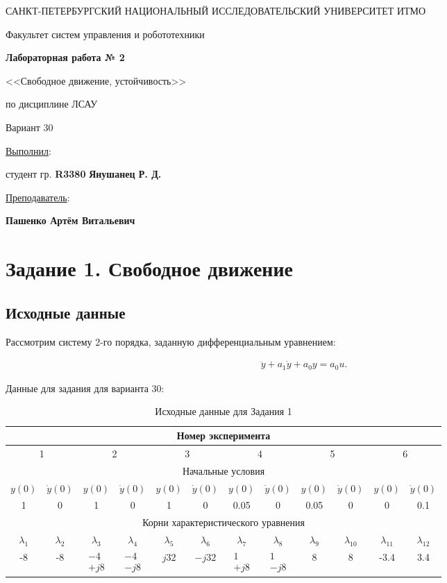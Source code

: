 \documentclass[a5paper, 10pt]{article}
\theoremstyle{definition}
\theoremstyle{plain}
\theoremstyle{remark}
\newcommand*{\titlePage}{
	\thispagestyle{title}
	\begingroup
	\begin{center}
		\vspace*{6ex}
		
		{\small
			САНКТ-ПЕТЕРБУРГСКИЙ НАЦИОНАЛЬНЫЙ ИССЛЕДОВАТЕЛЬСКИЙ УНИВЕРСИТЕТ ИТМО	
		}
		
		\vspace*{2ex}
		
		{\normalsize
			Факультет систем управления и робототехники
		}
		
		\vspace*{15ex}
		
		{\Large \bfseries 
			Лабораторная работа № 2
		}
\vspace*{2ex}
	{\Large \bfseries 
			
<<Свободное движение, устойчивость>>
		}
\vspace*{2ex}
		
		{\normalsize
			по дисциплине ЛСАУ
		}
\vspace*{2ex}
	{\Large \bfseries 
			
Вариант 30
		}

	\end{center}
	\vspace*{8ex}
	\begin{flushright}
		{\large 
			\underline{Выполнил}:\\
			\begin{flushright}
				студент гр. \textbf{R3380} \textbf{Янушанец Р. Д.}\\
			\end{flushright}
		}
		
		\vspace*{6ex}
		
		{\large 
			\underline{Преподаватель}:\\
            \begin{flushright}
            \textbf{Пашенко Артём Витальевич}
            \end{flushright}
		}
	\end{flushright}
	\newpage
	\setcounter{page}{1}
	\endgroup}
\begin{document}
	\titlePage
	\pagestyle{style}
\newpage

\tableofcontents

\newpage


\section{Задание 1. Свободное движение}

\subsection{Исходные данные}

Рассмотрим систему 2-го порядка, заданную дифференциальным уравнением:

\begin{align}\label{du1}
    \ddot{y}+a_1\dot{y}+a_0y=a_0u.
\end{align}

Данные для задания для варианта 30:

\begin{table}[H]
\centering
\begin{tabular}{|c|c|c|c|c|c|c|c|c|c|c|c|}
\hline
\multicolumn{12}{|c|}{Номер эксперимента} \\
\hline
\multicolumn{2}{|c|}{1} & \multicolumn{2}{|c|}{2} & \multicolumn{2}{|c|}{3} & \multicolumn{2}{|c|}{4} & \multicolumn{2}{|c|}{5} & \multicolumn{2}{|c|}{6} \\
\hline
\multicolumn{12}{|c|}{Начальные условия} \\
\hline
$y(0)$ & $\dot{y}(0)$ &$y(0)$ & $\dot{y}(0)$ &$y(0)$ & $\dot{y}(0)$ &$y(0)$ & $\dot{y}(0)$ &$y(0)$ & $\dot{y}(0)$ &$y(0)$ & $\dot{y}(0)$  \\
\hline
1 & 0 & 1 & 0 & 1 & 0 & 0.05 & 0 & 0.05 & 0 & 0 & 0.1 \\
\hline
\multicolumn{12}{|c|}{Корни характеристического уравнения} \\
\hline
$\lambda_1$ & $\lambda_2$ & $\lambda_3$ & $\lambda_4$ & $\lambda_5$ & $\lambda_6$ &$\lambda_7$ & $\lambda_8$ & $\lambda_9$ & $\lambda_{10}$ & $\lambda_{11}$ & $\lambda_{12}$ \\
\hline
-8 & -8 & $\begin{matrix}
-4 \\
+j8
\end{matrix}$ & $\begin{matrix}
-4 \\
-j8
\end{matrix}$ & $j32$ & $-j32$  & $\begin{matrix}
1 \\
+j8
\end{matrix}$ & $\begin{matrix}
1 \\
-j8
\end{matrix}$  & 8 & 8 & -3.4 & 3.4\\
\hline

\end{tabular}
\caption{Исходные данные для Задания 1}
\label{tab:variant30}
\end{table}
\end{document}
